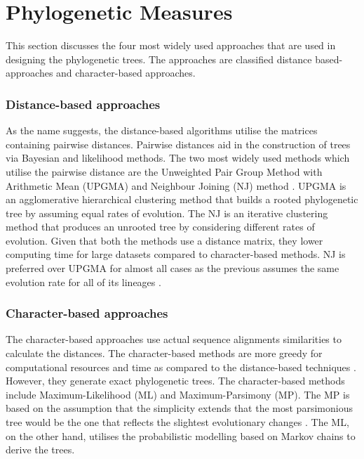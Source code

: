\chapter{Phylogenetic Measures}
 \setcounter{page}{16}

This section discusses the four most widely used approaches that are used in designing the phylogenetic trees. The approaches are classified distance based-approaches and character-based approaches.

\subsection{Distance-based approaches}

As the name suggests, the distance-based algorithms utilise the matrices containing pairwise distances. Pairwise distances aid in the construction of trees via Bayesian and likelihood methods. The two most widely used methods which utilise the pairwise distance are the Unweighted Pair Group Method with Arithmetic Mean (UPGMA) and Neighbour Joining (NJ) method \cite{munjal_2019_phylogenetics}. UPGMA is an agglomerative hierarchical clustering method that builds a rooted phylogenetic tree by assuming equal rates of evolution. The NJ is an iterative clustering method that produces an unrooted tree by considering different rates of evolution. Given that both the methods use a distance matrix, they lower computing time for large datasets compared to character-based methods. NJ is preferred over UPGMA for almost all cases as the previous assumes the same evolution rate for all of its lineages \cite{munjal_2019_phylogenetics}.

\subsection{Character-based approaches}

The character-based approaches use actual sequence alignments similarities to calculate the distances. The character-based methods are more greedy for computational resources and time as compared to the distance-based techniques \cite{munjal_2019_phylogenetics}. However, they generate exact phylogenetic trees. The character-based methods include Maximum-Likelihood (ML) and Maximum-Parsimony (MP). The MP is based on the assumption that the simplicity extends that the most parsimonious tree would be the one that reflects the slightest evolutionary changes \cite{munjal_2019_phylogenetics}. The ML, on the other hand, utilises the probabilistic modelling based on Markov chains to derive the trees.

